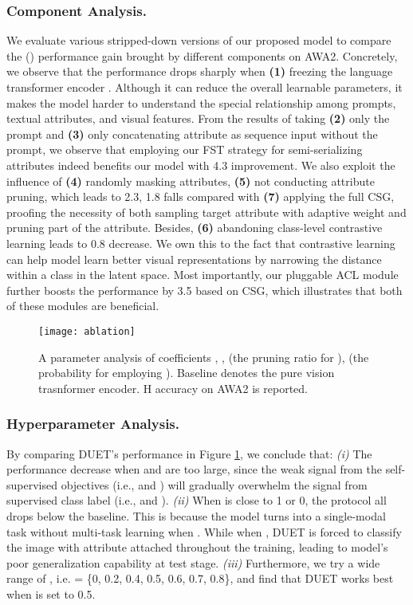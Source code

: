 \documentclass[letterpaper]{article} \usepackage{aaai23}  \usepackage{times}  \usepackage{helvet}  \usepackage{courier}  \usepackage[hyphens]{url}  \usepackage{graphicx} \urlstyle{rm} \def\UrlFont{\rm}  \usepackage{natbib}  \usepackage{caption} \frenchspacing  \setlength{\pdfpagewidth}{8.5in}  \setlength{\pdfpageheight}{11in}  \usepackage{algorithm}
\newcommand{\fy}[1]{{\color{black}#1}}
\begin{document}
\subsubsection{\textbf{Component Analysis.}}
We evaluate various stripped-down versions of our proposed model to compare the  () performance gain brought by different components on AWA2.
Concretely, we observe that the performance drop{s} sharply when 
\textbf{(1)} freezing the language transformer encoder . Although it
  \fy{can} reduce the overall learnable parameters, it makes the model hard{er} to understand the special relationship among prompts, textual attributes, and visual features.
From the results of taking \textbf{(2)} only the prompt and \textbf{(3)} only concatenating attribute as sequence input without the prompt, we observe that employing our FST strategy for semi-serializing attributes
indeed benefit{s} our model with 4.3 improvement.
We also exploit the influence of \textbf{(4)} {randomly} masking attributes, \textbf{(5)}  not conducting attribute pruning, which leads to 2.3, 1.8 falls compared with \textbf{(7)} applying the full CSG, proofing the necessity of both sampling target attribute with adaptive weight and pruning part of the attribute.
Besides,  \textbf{(6)} abandoning class-level contrastive learning leads to 0.8 decrease.
We own this to the fact that contrastive learning can help model learn better visual representations by narrowing  the distance within a class in the latent space.
Most importantly, our pluggable ACL module {further}
boosts the  performance by 3.5 based on CSG, which illustrates that both of these modules are {beneficial.}

\begin{figure}[htbp]
  \centering
   \vspace{-5pt}
  \texttt{[image: ablation]}
  \vspace{-5pt}
  \caption{A parameter analysis of coefficients , ,  (the pruning ratio for ),  (the probability for employing ). Baseline denotes the pure vision trasnformer encoder.
  {\rm{H} accuracy on AWA2 is reported.}
}
  \label{fig:parameter}
  \vspace{-10pt}
\end{figure}
\subsubsection{\textbf{Hyperparameter Analysis.}}
By comparing DUET's performance in Figure \ref{fig:parameter}, 
we conclude that:
\textit{(i)} 
The performance decrease when  and  are too large, since the weak signal from the self-supervised objective{s} (i.e.,  and ) will gradually overwhelm the signal from supervised class label (i.e.,  and ).
\textit{(ii)} 
When  is close to 1 or 0, the protocol all drops below the baseline.
This is because the model turns into a single-modal task without multi-task learning when . While when , DUET is forced to classify the image with attribute attached \fy{throughout} the training, \fy{leading to} model's poor generalization capability at test stage.
\textit{(iii)} 
Furthermore, we try a wide range of , i.e.  = \{0, 0.2, 0.4, 0.5, 0.6, 0.7, 0.8\}, and \fy{find that} DUET \fy{works best} when  is set to 0.5.
\end{document}
